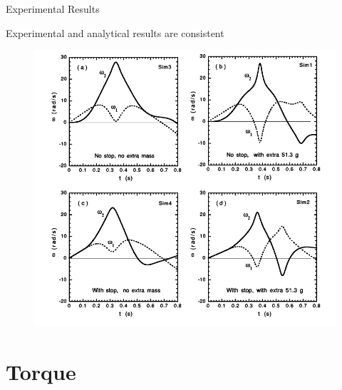 \documentclass[tikz]{beamer}
\begin{document}
\begin{frame} {Experimental Results}
	\only<5> {
		Experimental and analytical results are consistent
		\begin{figure}
			\centering
			\includegraphics[scale=0.25]{analyticalresults.png}
		\end{figure}
	}

\end{frame}

\section{Torque}
\end{document}
